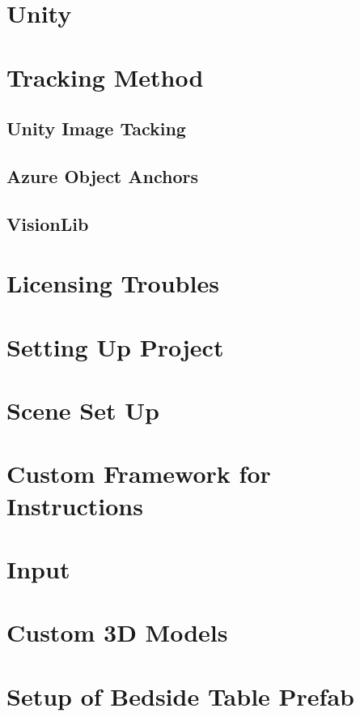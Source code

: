 \documentclass{l4proj}
\begin{document}
\section{Unity}

\section{Tracking Method}

\subsection{Unity Image Tacking}

\subsection{Azure Object Anchors}

\subsection{VisionLib}

\section{Licensing Troubles}

\section{Setting Up Project}
\section{Scene Set Up}

\section{Custom Framework for Instructions}

\section{Input}

\section{Custom 3D Models}
\section{Setup of Bedside Table Prefab}
\end{document}
